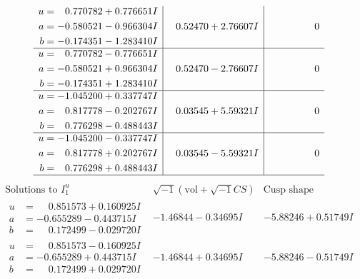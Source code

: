 \documentclass[1p]{elsarticle_modified}
\theoremstyle{definition}
\newcommand{\I}{\sqrt{-1}}
\begin{document}
$$\begin{array}{c|c|c}
\begin{aligned}
u &= \phantom{-}0.770782 + 0.776651 I \\
a &= -0.580521 - 0.966304 I \\
b &= -0.174351 - 1.283410 I\end{aligned}
 & \phantom{-}0.52470 + 2.76607 I & \phantom{-0.000000 } 0 \\ \hline\begin{aligned}
u &= \phantom{-}0.770782 - 0.776651 I \\
a &= -0.580521 + 0.966304 I \\
b &= -0.174351 + 1.283410 I\end{aligned}
 & \phantom{-}0.52470 - 2.76607 I & \phantom{-0.000000 } 0 \\ \hline\begin{aligned}
u &= -1.045200 + 0.337747 I \\
a &= \phantom{-}0.817778 - 0.202767 I \\
b &= \phantom{-}0.776298 - 0.488443 I\end{aligned}
 & \phantom{-}0.03545 + 5.59321 I & \phantom{-0.000000 } 0 \\ \hline\begin{aligned}
u &= -1.045200 - 0.337747 I \\
a &= \phantom{-}0.817778 + 0.202767 I \\
b &= \phantom{-}0.776298 + 0.488443 I\end{aligned}
 & \phantom{-}0.03545 - 5.59321 I & \phantom{-0.000000 } 0\\
 \hline 
 \end{array}$$\newpage$$\begin{array}{c|c|c}  
\text{Solutions to }I^u_{1}& \I (\text{vol} + \sqrt{-1}CS) & \text{Cusp shape}\\
 \hline 
\begin{aligned}
u &= \phantom{-}0.851573 + 0.160925 I \\
a &= -0.655289 - 0.443715 I \\
b &= \phantom{-}0.172499 - 0.029720 I\end{aligned}
 & -1.46844 - 0.34695 I & -5.88246 + 0.51749 I \\ \hline\begin{aligned}
u &= \phantom{-}0.851573 - 0.160925 I \\
a &= -0.655289 + 0.443715 I \\
b &= \phantom{-}0.172499 + 0.029720 I\end{aligned}
 & -1.46844 + 0.34695 I & -5.88246 - 0.51749 I \\ \hline\begin{aligned}

\end{aligned}
\end{array}$$
\end{document}
